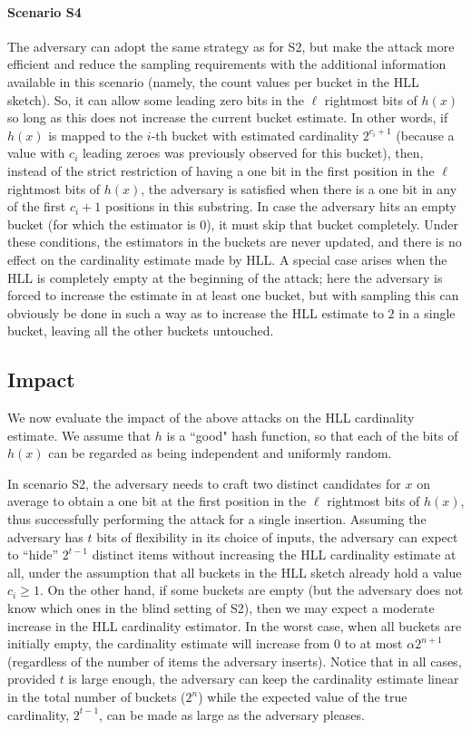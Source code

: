 \documentclass{IEEEtran}
\begin{document}
\noindent\paragraph{Scenario S4} The adversary can adopt the same strategy as for S2, but make the attack more efficient and reduce the sampling requirements with the additional information available in this scenario (namely, the count values per bucket in the HLL sketch). So, it can allow some leading zero bits in the $\ell$ rightmost bits of $h(x)$ so long as this does not increase the current bucket estimate. In other words, if $h(x)$ is mapped to the $i$-th bucket with estimated cardinality $2^{c_i + 1}$ (because a value with $c_i$ leading zeroes was previously observed for this bucket), then, instead of the strict restriction of having a one bit in the first position in the $\ell$ rightmost bits of $h(x)$, the adversary is satisfied when there is a one bit in any of the first $c_i+1$ positions in this substring. In case the adversary hits an empty bucket (for which the estimator is 0), it must skip that bucket completely. Under these conditions, the estimators in the buckets are never updated, and there is no effect on the cardinality estimate made by HLL.  A special case arises when the HLL is completely empty at the beginning of the attack; here the adversary is forced to increase the estimate in at least one bucket, but with sampling this can obviously be done in such a way as to increase the HLL estimate to $2$ in a single bucket, leaving all the other buckets untouched.

\subsection{Impact}
We now evaluate the impact of the above attacks on the HLL cardinality estimate. We assume that $h$ is a ``good" hash function, so that each of the bits of $h(x)$ can be regarded as being independent and uniformly random.

In scenario S2, the adversary needs to craft two distinct candidates for $x$ on average to obtain a one bit at the first position in the $\ell$ rightmost bits of $h(x)$, thus successfully performing the attack for a single insertion. Assuming the adversary has $t$ bits of flexibility in its choice of inputs, the adversary can expect to ``hide''  $2^{t-1}$ distinct items without increasing the HLL cardinality estimate at all, under the assumption that all buckets in the HLL sketch already hold a value $c_i \ge 1$. On the other hand, if some buckets are empty (but the adversary does not know which ones in the blind setting of S2), then we may expect a moderate increase in the HLL cardinality estimator. In the worst case, when all buckets are initially empty, the cardinality estimate will increase from 0 to at most $\alpha2^{n+1}$ (regardless of the number of items the adversary inserts). Notice that in all cases, provided $t$ is large enough, the adversary can keep the cardinality estimate linear in the total number of buckets ($2^n$) while the expected value of the true cardinality, $2^{t-1}$, can be made as large as the adversary pleases.
\end{document}
